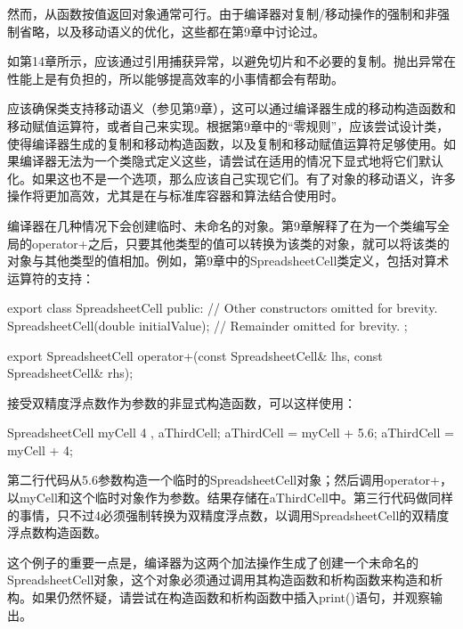 然而，从函数按值返回对象通常可行。由于编译器对复制/移动操作的强制和非强制省略，以及移动语义的优化，这些都在第9章中讨论过。


如第14章所示，应该通过引用捕获异常，以避免切片和不必要的复制。抛出异常在性能上是有负担的，所以能够提高效率的小事情都会有帮助。


应该确保类支持移动语义（参见第9章），这可以通过编译器生成的移动构造函数和移动赋值运算符，或者自己来实现。根据第9章中的“零规则”，应该尝试设计类，使得编译器生成的复制和移动构造函数，以及复制和移动赋值运算符足够使用。如果编译器无法为一个类隐式定义这些，请尝试在适用的情况下显式地将它们默认化。如果这也不是一个选项，那么应该自己实现它们。有了对象的移动语义，许多操作将更加高效，尤其是在与标准库容器和算法结合使用时。


编译器在几种情况下会创建临时、未命名的对象。第9章解释了在为一个类编写全局的operator+之后，只要其他类型的值可以转换为该类的对象，就可以将该类的对象与其他类型的值相加。例如，第9章中的SpreadsheetCell类定义，包括对算术运算符的支持：

\begin{cpp}
export class SpreadsheetCell
{
    public:
        // Other constructors omitted for brevity.
        SpreadsheetCell(double initialValue);
        // Remainder omitted for brevity.
};

export SpreadsheetCell operator+(const SpreadsheetCell& lhs,
    const SpreadsheetCell& rhs);
\end{cpp}

接受双精度浮点数作为参数的非显式构造函数，可以这样使用：

\begin{cpp}
SpreadsheetCell myCell { 4 }, aThirdCell;
aThirdCell = myCell + 5.6;
aThirdCell = myCell + 4;
\end{cpp}

第二行代码从5.6参数构造一个临时的SpreadsheetCell对象；然后调用operator+，以myCell和这个临时对象作为参数。结果存储在aThirdCell中。第三行代码做同样的事情，只不过4必须强制转换为双精度浮点数，以调用SpreadsheetCell的双精度浮点数构造函数。

这个例子的重要一点是，编译器为这两个加法操作生成了创建一个未命名的SpreadsheetCell对象，这个对象必须通过调用其构造函数和析构函数来构造和析构。如果仍然怀疑，请尝试在构造函数和析构函数中插入print()语句，并观察输出。

